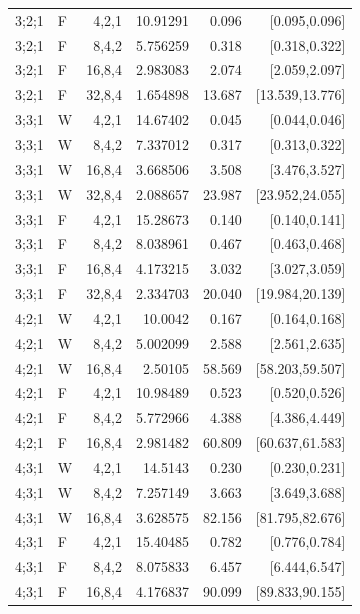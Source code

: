 {\begin{longtable}{@{}llrrrr@{}}
3;2;1 & F & 4,2,1 & 10.91291 & 0.096 & [0.095,0.096] \\
3;2;1 & F & 8,4,2 & 5.756259 & 0.318 & [0.318,0.322] \\
3;2;1 & F & 16,8,4 & 2.983083 & 2.074 & [2.059,2.097] \\
3;2;1 & F & 32,8,4 & 1.654898 & 13.687 & [13.539,13.776] \\
3;3;1 & W & 4,2,1 & 14.67402 & 0.045 & [0.044,0.046] \\
3;3;1 & W & 8,4,2 & 7.337012 & 0.317 & [0.313,0.322] \\
3;3;1 & W & 16,8,4 & 3.668506 & 3.508 & [3.476,3.527] \\
3;3;1 & W & 32,8,4 & 2.088657 & 23.987 & [23.952,24.055] \\
3;3;1 & F & 4,2,1 & 15.28673 & 0.140 & [0.140,0.141] \\
3;3;1 & F & 8,4,2 & 8.038961 & 0.467 & [0.463,0.468] \\
3;3;1 & F & 16,8,4 & 4.173215 & 3.032 & [3.027,3.059] \\
3;3;1 & F & 32,8,4 & 2.334703 & 20.040 & [19.984,20.139] \\
4;2;1 & W & 4,2,1 & 10.0042 & 0.167 & [0.164,0.168] \\
4;2;1 & W & 8,4,2 & 5.002099 & 2.588 & [2.561,2.635] \\
4;2;1 & W & 16,8,4 & 2.50105 & 58.569 & [58.203,59.507] \\
4;2;1 & F & 4,2,1 & 10.98489 & 0.523 & [0.520,0.526] \\
4;2;1 & F & 8,4,2 & 5.772966 & 4.388 & [4.386,4.449] \\
4;2;1 & F & 16,8,4 & 2.981482 & 60.809 & [60.637,61.583] \\
4;3;1 & W & 4,2,1 & 14.5143 & 0.230 & [0.230,0.231] \\
4;3;1 & W & 8,4,2 & 7.257149 & 3.663 & [3.649,3.688] \\
4;3;1 & W & 16,8,4 & 3.628575 & 82.156 & [81.795,82.676] \\
4;3;1 & F & 4,2,1 & 15.40485 & 0.782 & [0.776,0.784] \\
4;3;1 & F & 8,4,2 & 8.075833 & 6.457 & [6.444,6.547] \\
4;3;1 & F & 16,8,4 & 4.176837 & 90.099 & [89.833,90.155] \\
\end{longtable}
}
